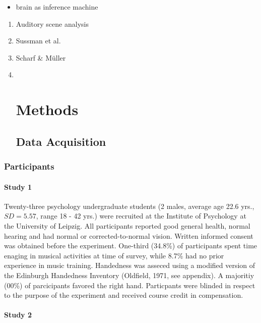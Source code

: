 \documentclass[stu,a4paper,11pt,floatsintext]{apa7}
\providecommand{\tightlist}{%
  \setlength{\itemsep}{0pt}\setlength{\parskip}{0pt}}
\begin{document}
\begin{itemize}
\tightlist
\item
  brain as inference machine
\end{itemize}

\begin{enumerate}
\def\labelenumi{\alph{enumi}.}
\item
  Auditory scene analysis
\item
  Sussman et al.
\item
  Scharf \& Müller
\item ~
  \hypertarget{methods}{%
  \section{Methods}\label{methods}}

  \hypertarget{data-acquisition}{%
  \subsection{Data Acquisition}\label{data-acquisition}}
\end{enumerate}

\hypertarget{participants}{%
\subsubsection{Participants}\label{participants}}

\hypertarget{study-1}{%
\paragraph{Study 1}\label{study-1}}

Twenty-three psychology undergraduate students (2 males, average age
22.6 yrs., \(SD=5.57\), range 18 - 42 yrs.) were recruited at the
Institute of Psychology at the University of Leipzig. All participants
reported good general health, normal hearing and had normal or
corrected-to-normal vision. Written informed consent was obtained before
the experiment. One-third (34.8\%) of participants spent time enaging in
musical activities at time of survey, while 8.7\% had no prior
experience in music training. Handedness was asseced using a modified
version of the Edinburgh Handedness Inventory (Oldfield, 1971, see
appendix). A majoritiy (00\%) of parcicipants favored the right hand.
Particpants were blinded in respect to the purpose of the experiment and
received course credit in compensation.

\hypertarget{study-2}{%
\paragraph{Study 2}\label{study-2}}
\end{document}
